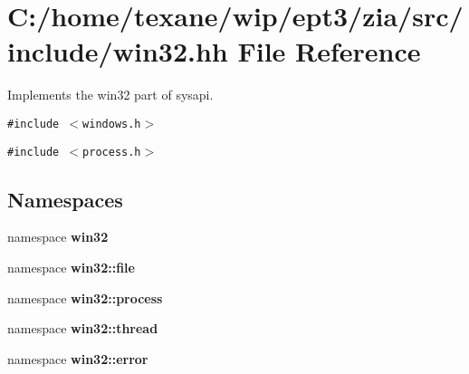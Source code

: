 \section{C:/home/texane/wip/ept3/zia/src/include/win32.hh File Reference}
\label{win32_8hh}
Implements the win32 part of sysapi. 

{\tt \#include $<$windows.h$>$}\par
{\tt \#include $<$process.h$>$}\par
\subsection*{Namespaces}
\begin{CompactItemize}
\item 
namespace {\bf win32}
\item 
namespace {\bf win32::file}
\item 
namespace {\bf win32::process}
\item 
namespace {\bf win32::thread}
\item 
namespace {\bf win32::error}
\end{CompactItemize}

